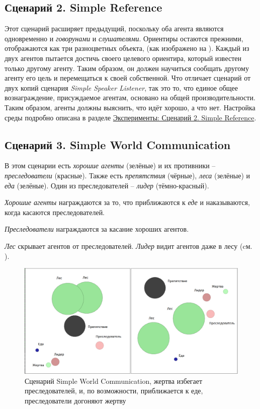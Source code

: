 \subsection{Сценарий 2. Simple Reference} \label{intro-sr}

Этот сценарий расширяет предыдущий, поскольку оба агента являются одновременно и \textit{говорунами} и \textit{слушателями}. Ориентиры остаются прежними, отображаются как три разноцветных объекта, (как изображено на ). Каждый из двух агентов пытается достичь своего целевого ориентира, который известен только другому агенту. Таким образом, он должен научиться сообщать другому агенту его цель и перемещаться к своей собственной. Что отличает сценарий от двух копий сценария \textit{Simple Speaker Listener}, так это то, что единое общее вознаграждение, присуждаемое агентам, основано на общей производительности. Таким образом, агенты должны выяснить, что идёт хорошо, а что нет. Настройка среды подробно описана в разделе \hyperref[exp-sr]{Эксперименты: Сценарий 2. Simple Reference}.

\subsection{Сценарий 3. Simple World Communication} \label{intro-swc}

В этом сценарии есть \textit{хорошие агенты} (зелёные) и их противники – \textit{преследователи} (красные). Также есть \textit{препятствия} (чёрные), \textit{леса} (зелёные) и \textit{еда} (зелёные). Один из преследователей – \textit{лидер} (тёмно-красный).

\textit{Хорошие агенты} награждаются за то, что приближаются к \textit{еде} и наказываются, когда касаются преследователей.

\textit{Преследователи} награждаются за касание хороших агентов.

\textit{Лес} скрывает агентов от преследователей. \textit{Лидер} видит агентов даже в лесу (cм. ).

\begin{figure}[ht!] 
	\center
	\includegraphics [scale=0.41] {my_folder/images/intro/swc.png}
	\caption{Сценарий Simple World Communication, жертва избегает преследователей, и, по возможности, приближается к еде, преследователи догоняют жертву}
	\label{fig:swc}  
\end{figure}

